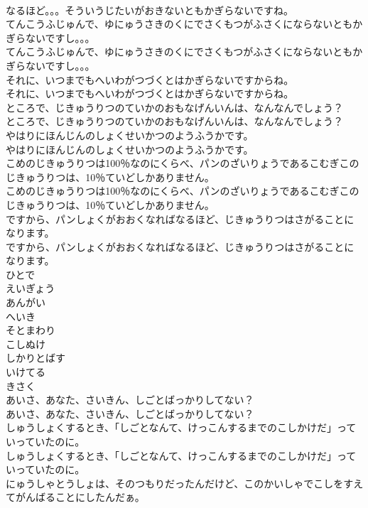 \documentclass[8pt]{extreport}
\begin{document}
\begin{CJK}{UTF8}{min}
\\	なるほど。。。そういうじたいがおきないともかぎらないですね。
\\	てんこうふじゅんで、ゆにゅうさきのくにでさくもつがふさくにならないともかぎらないですし。。。
\\	てんこうふじゅんで、ゆにゅうさきのくにでさくもつがふさくにならないともかぎらないですし。。。
\\	それに、いつまでもへいわがつづくとはかぎらないですからね。
\\	それに、いつまでもへいわがつづくとはかぎらないですからね。
\\	ところで、じきゅうりつのていかのおもなげんいんは、なんなんでしょう？
\\	ところで、じきゅうりつのていかのおもなげんいんは、なんなんでしょう？
\\	やはりにほんじんのしょくせいかつのようふうかです。
\\	やはりにほんじんのしょくせいかつのようふうかです。
\\	こめのじきゅうりつは100％なのにくらべ、パンのざいりょうであるこむぎこのじきゅうりつは、10％ていどしかありません。
\\	こめのじきゅうりつは100％なのにくらべ、パンのざいりょうであるこむぎこのじきゅうりつは、10％ていどしかありません。
\\	ですから、パンしょくがおおくなればなるほど、じきゅうりつはさがることになります。
\\	ですから、パンしょくがおおくなればなるほど、じきゅうりつはさがることになります。
\\	ひとで
\\	えいぎょう
\\	あんがい
\\	へいき
\\	そとまわり
\\	こしぬけ
\\	しかりとばす
\\	いけてる
\\	きさく
\\	あいさ、あなた、さいきん、しごとばっかりしてない？
\\	あいさ、あなた、さいきん、しごとばっかりしてない？
\\	しゅうしょくするとき、「しごとなんて、けっこんするまでのこしかけだ」っていっていたのに。
\\	しゅうしょくするとき、「しごとなんて、けっこんするまでのこしかけだ」っていっていたのに。
\\	にゅうしゃとうしょは、そのつもりだったんだけど、このかいしゃでこしをすえてがんばることにしたんだぁ。

\end{CJK}
\end{document}
